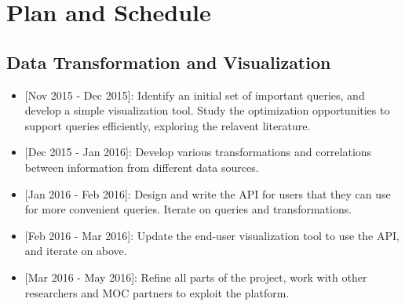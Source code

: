 \section{Plan and Schedule}
\label{sec:Plan}



\subsection{Data Transformation and Visualization}
\begin{itemize}
\item{[Nov 2015 - Dec 2015]:} Identify an initial set of important queries, and develop a simple visualization tool. Study the optimization opportunities to support queries efficiently, exploring the relavent literature. 
\item{[Dec 2015 - Jan 2016]:} Develop various transformations and correlations between information from different data sources. 
\item{[Jan 2016 - Feb 2016]:} Design and write the API for users that they can use for more convenient queries. Iterate on queries and transformations. 
\item{[Feb 2016 - Mar 2016]:} Update the end-user visualization tool to use the API, and iterate on above. 
\item{[Mar 2016 - May 2016]:} Refine all parts of the project, work with other researchers and MOC partners to exploit the platform. 
\end{itemize}
